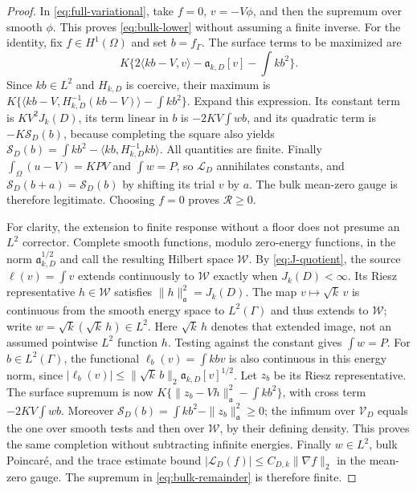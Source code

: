 \begin{proof}
In \eqref{eq:full-variational}, take $f=0$, $v=-V\phi$, and then the
supremum over smooth $\phi$. This proves \eqref{eq:bulk-lower} without
assuming a finite inverse. For the identity, fix $f\in H^1(\Omega)$
and set $b=f_\Gamma$. The surface terms to be maximized are
\[
 K\{2\langle kb-V,v\rangle-\mathfrak a_{k,D}[v]-\int kb^2\}.
\]
Since $kb\in L^2$ and $H_{k,D}$ is coercive, their maximum is
$K\{\langle kb-V,H_{k,D}^{-1}(kb-V)\rangle-\int kb^2\}$.
Expand this expression. Its constant term is $KV^2J_k(D)$, its term
linear in $b$ is $-2KV\int wb$, and its quadratic term is
$-K\mathcal S_D(b)$, because completing the square also yields
$\mathcal S_D(b)=\int kb^2-\langle kb,H_{k,D}^{-1}kb\rangle$.
All quantities are finite. Finally
$\int_\Omega(u-V)=KPV$ and $\int w=P$, so
$\mathcal L_D$ annihilates constants, and $\mathcal S_D(b+a)=\mathcal S_D(b)$
by shifting its trial $v$ by $a$. The bulk mean-zero gauge is therefore
legitimate. Choosing $f=0$ proves $\mathcal R\ge0$.

For clarity, the extension to finite response without a floor does not
presume an $L^2$ corrector. Complete smooth functions, modulo zero-energy
functions, in the norm $\mathfrak a_{k,D}^{1/2}$ and call the resulting
Hilbert space $\mathcal W$. By \eqref{eq:J-quotient}, the source
$\ell(v)=\int v$ extends continuously to $\mathcal W$ exactly when
$J_k(D)<\infty$. Its Riesz representative $h\in\mathcal W$ satisfies
$\|h\|_{\mathfrak a}^2=J_k(D)$. The map $v\mapsto\sqrt k\,v$
is continuous from the smooth energy space to $L^2(\Gamma)$ and thus
extends to $\mathcal W$; write $w=\sqrt k(\sqrt k\,h)\in L^2$.
Here $\sqrt k\,h$ denotes that extended image, not an assumed pointwise
$L^2$ function $h$. Testing against the constant gives $\int w=P$.
For $b\in L^2(\Gamma)$, the functional
$\ell_b(v)=\int kbv$ is also continuous in this energy norm, since
$|\ell_b(v)|\le\|\sqrt k\,b\|_2\mathfrak a_{k,D}[v]^{1/2}$.
Let $z_b$ be its Riesz representative. The surface supremum is now
$K\{\|z_b-Vh\|_{\mathfrak a}^2-\int kb^2\}$, with cross term
$-2KV\int wb$. Moreover
$\mathcal S_D(b)=\int kb^2-\|z_b\|_{\mathfrak a}^2\ge0$;
the infimum over $\mathcal V_D$ equals the one over smooth tests and
then over $\mathcal W$, by their defining density. This proves the
same completion without subtracting infinite energies. Finally
$w\in L^2$, bulk Poincar\'e, and the trace estimate bound
$|\mathcal L_D(f)|\le C_{D,k}\|\nabla f\|_2$ in the mean-zero
gauge. The supremum in \eqref{eq:bulk-remainder} is therefore finite.
\end{proof}

